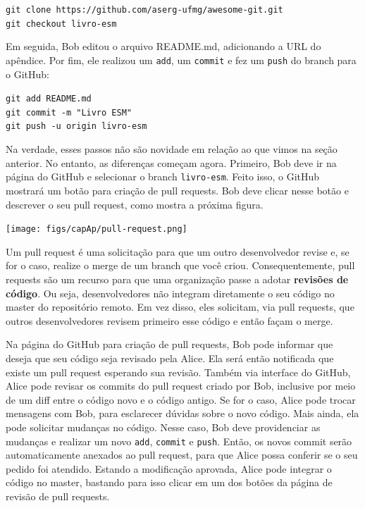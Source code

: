 \documentclass[
  11pt,
  twoside]{book}
\newcommand{\passthrough}[1]{#1}
\let\origfigure\figure
\let\endorigfigure\endfigure
\renewenvironment{figure}[1][2] {
    \expandafter\origfigure\expandafter[!h]
} {
    \endorigfigure
}
\begin{document}
\passthrough{\lstinline!git clone https://github.com/aserg-ufmg/awesome-git.git!}~\\
\passthrough{\lstinline!git checkout livro-esm!}

Em seguida, Bob editou o arquivo README.md, adicionando a URL do
apêndice. Por fim, ele realizou um \passthrough{\lstinline!add!}, um
\passthrough{\lstinline!commit!} e fez um \passthrough{\lstinline!push!}
do branch para o GitHub:

\passthrough{\lstinline!git add README.md!}~\\
\passthrough{\lstinline!git commit -m "Livro ESM"!}~\\
\passthrough{\lstinline!git push -u origin livro-esm!}

Na verdade, esses passos não são novidade em relação ao que vimos na
seção anterior. No entanto, as diferenças começam agora. Primeiro, Bob
deve ir na página do GitHub e selecionar o branch
\passthrough{\lstinline!livro-esm!}. Feito isso, o GitHub mostrará um
botão para criação de pull requests. Bob deve clicar nesse botão e
descrever o seu pull request, como mostra a próxima figura.

\begin{figure}
\centering
\texttt{[image: figs/capAp/pull-request.png]}
\caption{Exemplo de pull request}
\end{figure}

Um pull request é uma solicitação para que um outro desenvolvedor revise
e, se for o caso, realize o merge de um branch que você criou.
Consequentemente, pull requests são um recurso para que uma organização
passe a adotar \textbf{revisões de código}. Ou seja, desenvolvedores não
integram diretamente o seu código no master do repositório remoto. Em
vez disso, eles solicitam, via pull requests, que outros desenvolvedores
revisem primeiro esse código e então façam o merge.

Na página do GitHub para criação de pull requests, Bob pode informar que
deseja que seu código seja revisado pela Alice. Ela será então
notificada que existe um pull request esperando sua revisão. Também via
interface do GitHub, Alice pode revisar os commits do pull request
criado por Bob, inclusive por meio de um diff entre o código novo e o
código antigo. Se for o caso, Alice pode trocar mensagens com Bob, para
esclarecer dúvidas sobre o novo código. Mais ainda, ela pode solicitar
mudanças no código. Nesse caso, Bob deve providenciar as mudanças e
realizar um novo \passthrough{\lstinline!add!},
\passthrough{\lstinline!commit!} e \passthrough{\lstinline!push!}.
Então, os novos commit serão automaticamente anexados ao pull request,
para que Alice possa conferir se o seu pedido foi atendido. Estando a
modificação aprovada, Alice pode integrar o código no master, bastando
para isso clicar em um dos botões da página de revisão de pull requests.
\end{document}
